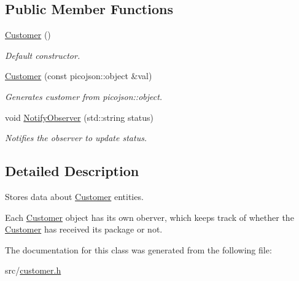 \subsection*{Public Member Functions}
\begin{DoxyCompactItemize}
\item 
\mbox{\label{classcsci3081_1_1Customer_a070d6e1d53ddad733934c97994b104f3}} 
\hyperlink{classcsci3081_1_1Customer_a070d6e1d53ddad733934c97994b104f3}{Customer} ()
\begin{DoxyCompactList}\small\item\em Default constructor. \end{DoxyCompactList}\item 
\mbox{\label{classcsci3081_1_1Customer_abbbf2b0f11d653b3cb0c2926064a830a}} 
\hyperlink{classcsci3081_1_1Customer_abbbf2b0f11d653b3cb0c2926064a830a}{Customer} (const picojson\+::object \&val)
\begin{DoxyCompactList}\small\item\em Generates customer from picojson\+::object. \end{DoxyCompactList}\item 
\mbox{\label{classcsci3081_1_1Customer_ae740879dfd4b71ac89bcc20d51ea3187}} 
void \hyperlink{classcsci3081_1_1Customer_ae740879dfd4b71ac89bcc20d51ea3187}{Notify\+Observer} (std\+::string status)
\begin{DoxyCompactList}\small\item\em Notifies the observer to update status. \end{DoxyCompactList}\end{DoxyCompactItemize}


\subsection{Detailed Description}
Stores data about \hyperlink{classcsci3081_1_1Customer}{Customer} entities. 

Each \hyperlink{classcsci3081_1_1Customer}{Customer} object has its own oberver, which keeps track of whether the \hyperlink{classcsci3081_1_1Customer}{Customer} has received its package or not. 

The documentation for this class was generated from the following file\+:\begin{DoxyCompactItemize}
\item 
src/\hyperlink{customer_8h}{customer.\+h}\end{DoxyCompactItemize}
